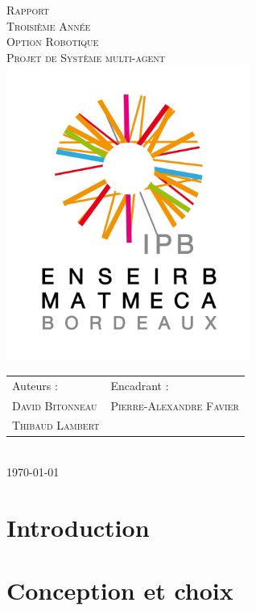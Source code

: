 \documentclass[a4paper, 11pt]{report}
\begin{document}
\begin{titlepage}
  \begin{center}
      \textsc{\huge Rapport\\[0.2cm]Troisième Année\\[0.2cm]Option
      Robotique}\\[\stretch{1}]
      \textsc{\Huge Projet de Système multi-agent}\\[\stretch{1}]
      \includegraphics[width=8cm]{logo-IPB.jpg}\\[\stretch{1}]
	\begin{tabular*}{\textwidth}{@{} m{10cm} l}
		\large{Auteurs :} & \large{Encadrant :} \\[0.5cm]
	    \textsc{\Large David Bitonneau} & \textsc{\Large Pierre-Alexandre Favier} \\
	    \textsc{\Large Thibaud Lambert}\\ 
    \end{tabular*}
	\\[2cm]
    \textsc{\Large \today}\\

\end{center}

\end{titlepage}

\clearpage
\tableofcontents
\clearpage

\chapter{Introduction}


\chapter{Conception et choix}

\end{document}
